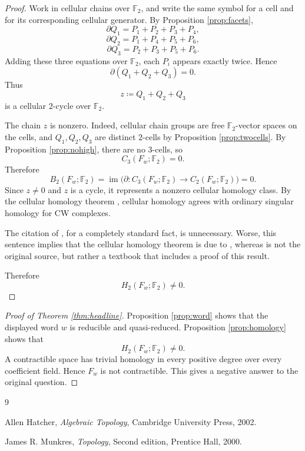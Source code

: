 \documentclass[12pt]{article}
\newcommand{\Ftwo}{\mathbb{F}_2}
\newcommand{\defeq}{\coloneqq}
\theoremstyle{definition}
\newcommand{\review}[1]{\begin{reviewbox}#1\end{reviewbox}}
\begin{document}
\begin{proof}
Work in cellular chains over \(\Ftwo\), and write the same symbol for a cell and for its corresponding cellular generator.  By Proposition \ref{prop:facets},
\[
\partial Q_1=P_1+P_2+P_3+P_4,
\]
\[
\partial Q_2=P_1+P_4+P_5+P_6,
\]
\[
\partial Q_3=P_2+P_3+P_5+P_6.
\]
Adding these three equations over \(\Ftwo\), each \(P_i\) appears exactly twice.  Hence
\[
\partial(Q_1+Q_2+Q_3)=0.
\]
Thus
\[
z\defeq Q_1+Q_2+Q_3
\]
is a cellular \(2\)-cycle over \(\Ftwo\).

The chain \(z\) is nonzero.  Indeed, cellular chain groups are free \(\Ftwo\)-vector spaces on the cells, and \(Q_1,Q_2,Q_3\) are distinct \(2\)-cells by Proposition \ref{prop:twocells}.  By Proposition \ref{prop:nohigh}, there are no \(3\)-cells, so
\[
C_3(F_w;\Ftwo)=0.
\]
Therefore
\[
B_2(F_w;\Ftwo)=\operatorname{im}\bigl(\partial:C_3(F_w;\Ftwo)\to C_2(F_w;\Ftwo)\bigr)=0.
\]
Since \(z\neq 0\) and \(z\) is a cycle, it represents a nonzero cellular homology class.  By the cellular homology theorem \cite[Chapter 2]{Hatcher}, cellular homology agrees with ordinary singular homology for CW complexes.  \review{The citation of \cite[Chapter 2]{Hatcher}, for a completely standard fact, is unnecessary. Worse, this sentence implies that the cellular homology theorem is due to \cite{Hatcher}, whereas \cite{Hatcher} is not the original source, but rather a textbook that includes a proof of this result.}
Therefore
\[
H_2(F_w;\Ftwo)\neq 0.
\]
\end{proof}

\begin{proof}[Proof of Theorem \ref{thm:headline}]
Proposition \ref{prop:word} shows that the displayed word \(w\) is reducible and quasi-reduced.  Proposition \ref{prop:homology} shows that
\[
H_2(F_w;\Ftwo)\neq 0.
\]
A contractible space has trivial homology in every positive degree over every coefficient field.  Hence \(F_w\) is not contractible.  This gives a negative answer to the original question.
\end{proof}

\begin{thebibliography}{9}

Allen Hatcher,
\emph{Algebraic Topology},
Cambridge University Press, 2002.

James R. Munkres,
\emph{Topology},
Second edition,
Prentice Hall, 2000.

\end{thebibliography}
\end{document}
